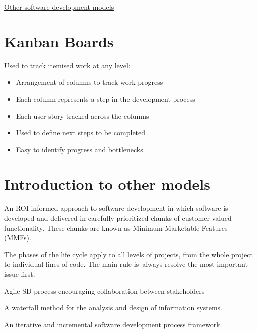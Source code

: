\documentclass{article}[18pt]
\begin{document}
\begin{center}
\underline{\huge Other software development models}
\end{center}
\section{Kanban Boards}
Used to track itemised work at any level:
\begin{itemize}
	\item Arrangement of columns to track work progress
	\item Each column represents a step in the development process
	\item Each user story tracked across the columns
	\item Used to define next steps to be completed
	\item Easy to identify progress and bottlenecks
\end{itemize}
\section{Introduction to other models}
\begin{definition}
	An ROI-informed approach to software development in which software is developed and delivered in carefully prioritized chunks of customer valued functionality. These chunks are known as Minimum Marketable Features (MMFs).
\end{definition}

\begin{definition}
	The phases of the life cycle apply to all levels of projects, from the whole project to individual lines of code. The main rule is always resolve the most important issue first.
\end{definition}


\begin{definition}[BDD]
	Agile SD process encouraging collaboration between stakeholders
\end{definition}

\begin{definition}
	A waterfall method for the analysis and design of information systems.
\end{definition}

\begin{definition}
	An iterative and incremental software development process framework
\end{definition}
\end{document}
